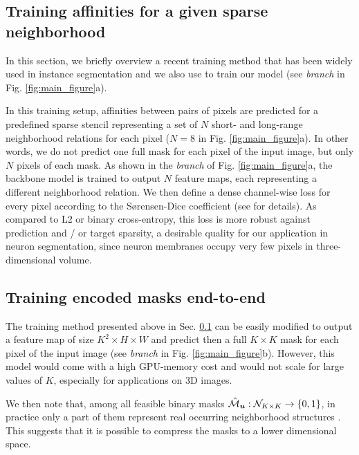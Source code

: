 \subsection{Training affinities for a given sparse neighborhood}\label{sec:affs_from_sparse}
In this section, we briefly overview a recent training method that has been widely used in instance segmentation \cite{liu2018affinity,Gao_2019_ICCV,lee2017superhuman,wolf2018mutex,bailoni2019generalized} and we also use to train our model (see \emph{\sparseBr branch} in Fig. \ref{fig:main_figure}a).

In this training setup, affinities between pairs of pixels are predicted for a predefined sparse stencil representing a set of $N$ short- and long-range neighborhood relations for each pixel ($N=8$ in Fig. \ref{fig:main_figure}a). In other words, we do not predict one full \maskname mask for each pixel of the input image, but only $N$ pixels of each \maskname mask. 
As shown in the \emph{\sparseBr branch} of Fig. \ref{fig:main_figure}a, the backbone model is trained to output $N$ feature maps, each representing a different neighborhood relation. We then define a dense channel-wise loss for every pixel according to the S\o rensen-Dice coefficient \cite{dice1945measures,sorensen1948method} (see \cite{wolf2018mutex} for details).
As compared to L2 or binary cross-entropy, this loss is more robust against prediction and / or target sparsity, a desirable quality for our application in neuron segmentation, since neuron membranes occupy very few pixels in three-dimensional volume.

\subsection{Training encoded \maskname masks end-to-end}\label{sec:encoding_masks}
The training method presented above in Sec. \ref{sec:affs_from_sparse} can be easily modified to output a feature map of size $K^2 \times H \times W$ and predict then a full $K\times K$ \maskname mask for each pixel of the input image (see \emph{\denseBr branch} in Fig. \ref{fig:main_figure}b).
However, this model would come with a high GPU-memory cost and would not scale for large values of $K$, especially for applications on 3D images.

We then note that, among all feasible binary masks $\hat{\mathcal{M}}_{\bm{u}}: \mathcal{N}_{K\times K} \rightarrow \{0,1\}$, in practice only a part of them represent real occurring neighborhood structures . 
This suggests that it is possible to compress the masks to a lower dimensional space. 

